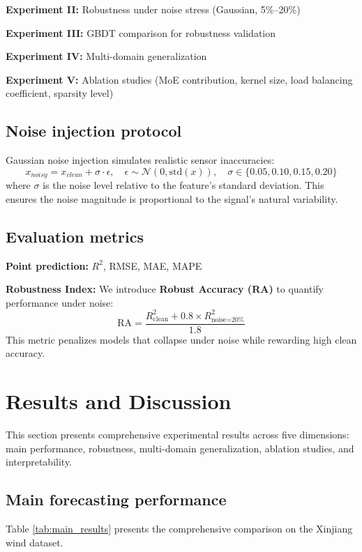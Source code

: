 \documentclass[review,3p,times,draft]{elsarticle}
\begin{document}
\textbf{Experiment II:} Robustness under noise stress (Gaussian, 5\%--20\%)

\textbf{Experiment III:} GBDT comparison for robustness validation

\textbf{Experiment IV:} Multi-domain generalization

\textbf{Experiment V:} Ablation studies (MoE contribution, kernel size, load balancing coefficient, sparsity level)

\subsection{Noise injection protocol}
Gaussian noise injection simulates realistic sensor inaccuracies:
\begin{equation}
    x_{noisy} = x_{clean} + \sigma \cdot \epsilon, \quad \epsilon \sim \mathcal{N}(0, \text{std}(x)), \quad \sigma \in \{0.05, 0.10, 0.15, 0.20\}
\end{equation}
where $\sigma$ is the noise level relative to the feature's standard deviation. This ensures the noise magnitude is proportional to the signal's natural variability.

\subsection{Evaluation metrics}
\textbf{Point prediction:} $R^2$, RMSE, MAE, MAPE

\textbf{Robustness Index:}
We introduce \textbf{Robust Accuracy (RA)} to quantify performance under noise:
\begin{equation}
    \text{RA} = \frac{R^2_{\text{clean}} + 0.8 \times R^2_{\text{noise=20\%}}}{1.8}
\end{equation}
This metric penalizes models that collapse under noise while rewarding high clean accuracy.

\section{Results and Discussion}
\label{sec:results}

This section presents comprehensive experimental results across five dimensions: main performance, robustness, multi-domain generalization, ablation studies, and interpretability.

\subsection{Main forecasting performance}
Table \ref{tab:main_results} presents the comprehensive comparison on the Xinjiang wind dataset.
\end{document}
